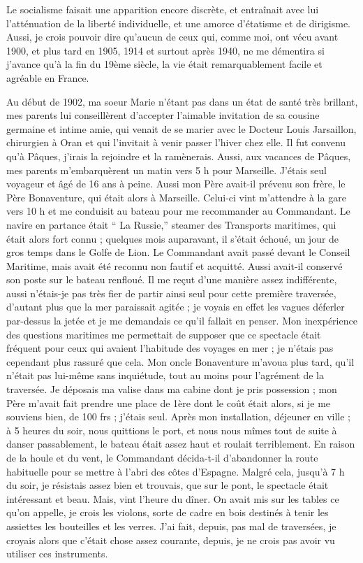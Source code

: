 \documentclass[11pt,a4paper]{report}
\begin{document}
Le socialisme faisait une apparition encore discrète, et entraînait avec lui l'atténuation de la liberté individuelle, et une amorce d'étatisme et de dirigisme. Aussi, je crois pouvoir dire qu'aucun de ceux qui, comme moi, ont vécu avant 1900, et plus tard en 1905, 1914 et surtout après 1940, ne me démentira si j'avance qu'à la fin du 19ème siècle, la vie était remarquablement facile et agréable en France.

Au début de 1902, ma soeur Marie n'étant pas dans un état de santé très brillant, mes parents lui conseillèrent d'accepter l'aimable invitation de sa cousine germaine et intime amie, qui venait de se marier avec le Docteur Louis Jarsaillon, chirurgien à Oran et qui l'invitait à venir passer l'hiver chez elle. Il fut convenu qu'à Pâques, j'irais la rejoindre et la ramènerais. Aussi, aux vacances de Pâques, mes parents m'embarquèrent un matin vers 5 h pour Marseille. J'étais seul voyageur et âgé de 16 ans à peine. Aussi mon Père avait-il prévenu son frère, le Père Bonaventure, qui était alors à Marseille. Celui-ci vint m'attendre à la gare vers 10 h et me conduisit au bateau pour me recommander au Commandant. Le navire en partance était `` La Russie,'' steamer des Transports maritimes, qui était alors fort connu ; quelques mois auparavant, il s'était échoué, un jour de gros temps dans le Golfe de Lion. Le Commandant avait passé devant le Conseil Maritime, mais avait été reconnu non fautif et acquitté. Aussi avait-il conservé son poste sur le bateau renfloué. Il me reçut d'une manière assez indifférente, aussi n'étais-je pas très fier de partir ainsi seul pour cette première traversée, d'autant plus que la mer paraissait agitée ; je voyais en effet les vagues déferler par-dessus la jetée et je me demandais ce qu'il fallait en penser. Mon inexpérience des questions maritimes me permettait de supposer que ce spectacle était fréquent pour ceux qui avaient l'habitude des voyages en mer ; je n'étais pas cependant plus rassuré que cela. Mon oncle Bonaventure m'avoua plus tard, qu'il n'était pas lui-même sans inquiétude, tout au moins pour l'agrément de la traversée. Je déposais ma valise dans ma cabine dont je pris possession ; mon Père m'avait fait prendre une place de 1ère dont le coût était alors, si je me souviens bien, de 100 frs ; j'étais seul. Après mon installation, déjeuner en ville ; à 5 heures du soir, nous quittions le port, et nous nous mîmes tout de suite à danser passablement, le bateau était assez haut et roulait terriblement. En raison de la houle et du vent, le Commandant décida-t-il d'abandonner la route habituelle pour se mettre à l'abri des côtes d'Espagne. Malgré cela, jusqu'à 7 h du soir, je résistais assez bien et trouvais, que sur le pont, le spectacle était intéressant et beau. Mais, vint l'heure du dîner. On avait mis sur les tables ce qu'on appelle, je crois les violons, sorte de cadre en bois destinés à tenir les assiettes les bouteilles et les verres. J'ai fait, depuis, pas mal de traversées, je croyais alors que c'était chose assez courante, depuis, je ne crois pas avoir vu utiliser ces instruments.
\end{document}
